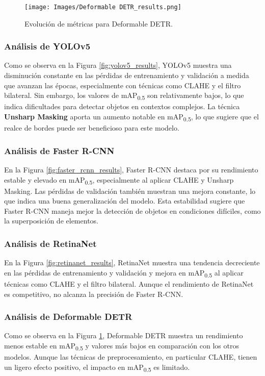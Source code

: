 \begin{figure}[htbp]
    \centering
    \texttt{[image: Images/Deformable DETR\_results.png]}
    \caption{Evolución de métricas para Deformable DETR.}
    \label{fig:deformable_detr_results}
\end{figure}

\subsubsection*{Análisis de YOLOv5}
Como se observa en la Figura \ref{fig:yolov5_results}, YOLOv5 muestra una disminución constante en las pérdidas de entrenamiento y validación a medida que avanzan las épocas, especialmente con técnicas como CLAHE y el filtro bilateral. Sin embargo, los valores de mAP\textsubscript{0.5} son relativamente bajos, lo que indica dificultades para detectar objetos en contextos complejos. La técnica \textbf{Unsharp Masking} aporta un aumento notable en mAP\textsubscript{0.5}, lo que sugiere que el realce de bordes puede ser beneficioso para este modelo.

\subsubsection*{Análisis de Faster R-CNN}
En la Figura \ref{fig:faster_rcnn_results}, Faster R-CNN destaca por su rendimiento estable y elevado en mAP\textsubscript{0.5}, especialmente al aplicar CLAHE y Unsharp Masking. Las pérdidas de validación también muestran una mejora constante, lo que indica una buena generalización del modelo. Esta estabilidad sugiere que Faster R-CNN maneja mejor la detección de objetos en condiciones difíciles, como la superposición de elementos.

\subsubsection*{Análisis de RetinaNet}
En la Figura \ref{fig:retinanet_results}, RetinaNet muestra una tendencia decreciente en las pérdidas de entrenamiento y validación y mejora en mAP\textsubscript{0.5} al aplicar técnicas como CLAHE y el filtro bilateral. Aunque el rendimiento de RetinaNet es competitivo, no alcanza la precisión de Faster R-CNN.

\subsubsection*{Análisis de Deformable DETR}
Como se observa en la Figura \ref{fig:deformable_detr_results}, Deformable DETR muestra un rendimiento menos estable en mAP\textsubscript{0.5} y valores más bajos en comparación con los otros modelos. Aunque las técnicas de preprocesamiento, en particular CLAHE, tienen un ligero efecto positivo, el impacto en mAP\textsubscript{0.5} es limitado.

